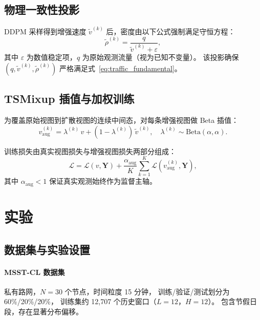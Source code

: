 \documentclass[12pt]{article}
\begin{document}

\subsection{物理一致性投影}
\label{sec:projection}

DDPM 采样得到增强速度 $\tilde{v}^{(k)}$ 后，密度由以下公式强制满足守恒方程：
\begin{equation}
  \tilde{\rho}^{(k)} = \frac{q}{\tilde{v}^{(k)} + \varepsilon},
  \label{eq:projection}
\end{equation}
其中 $\varepsilon$ 为数值稳定项，$q$ 为原始观测流量（视为已知不变量）。
该投影确保 $(q, \tilde{v}^{(k)}, \tilde{\rho}^{(k)})$ 严格满足式~\eqref{eq:traffic_fundamental}。

\subsection{TSMixup 插值与加权训练}
\label{sec:mixup}

为覆盖原始视图到扩散视图的连续中间态，对每条增强视图做 Beta 插值：
\begin{equation}
  v_{\text{aug}}^{(k)} = \lambda^{(k)}\, v + (1-\lambda^{(k)})\, \tilde{v}^{(k)},
  \quad \lambda^{(k)} \sim \text{Beta}(\alpha, \alpha).
  \label{eq:mixup}
\end{equation}

训练损失由真实视图损失与增强视图损失两部分组成：
\begin{equation}
  \mathcal{L} = \mathcal{L}(v, \mathbf{Y}) + \frac{\alpha_{\text{aug}}}{K}
  \sum_{k=1}^K \mathcal{L}(v_{\text{aug}}^{(k)}, \mathbf{Y}),
  \label{eq:loss}
\end{equation}
其中 $\alpha_{\text{aug}} < 1$ 保证真实观测始终作为监督主轴。

\section{实验}
\label{sec:exp}

\subsection{数据集与实验设置}

\paragraph{MSST-CL 数据集}
私有路网，$N=30$ 个节点，时间粒度 15 分钟，
训练/验证/测试划分为 60\%/20\%/20\%，
训练集约 12,707 个历史窗口（$L=12$，$H=12$）。
包含节假日段，存在显著分布偏移。
\end{document}
